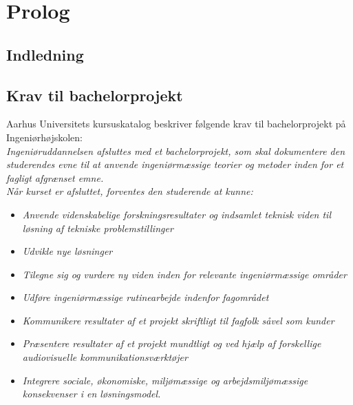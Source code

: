 \documentclass[rapport.tex]{subfiles}
\begin{document}
\section{Prolog}
	\subsection{Indledning}
	\subsection{Krav til bachelorprojekt}
	Aarhus Universitets kursuskatalog beskriver følgende krav til bachelorprojekt på Ingeniørhøjskolen:\\
	
	
\textit{	Ingeniøruddannelsen afsluttes med et bachelorprojekt, som skal dokumentere den studerendes evne til at anvende ingeniørmæssige teorier og metoder inden for et fagligt afgrænset emne. }\\

	
\textit{	Når kurset er afsluttet, forventes den studerende at kunne: 
}	
	\begin{itemize}
		\item\textit{ Anvende videnskabelige forskningsresultater og indsamlet teknisk viden til løsning af tekniske problemstillinger}
		\item \textit{Udvikle nye løsninger}
		\item \textit{Tilegne sig og vurdere ny viden inden for relevante ingeniørmæssige områder}
		\item \textit{Udføre ingeniørmæssige rutinearbejde indenfor fagområdet}
		\item \textit{Kommunikere resultater af et projekt skriftligt til fagfolk såvel som kunder}
		\item \textit{Præsentere resultater af et projekt mundtligt og ved hjælp af forskellige audiovisuelle kommunikationsværktøjer}
		\item \textit{Integrere sociale, økonomiske, miljømæssige og arbejdsmiljømæssige konsekvenser i en løsningsmodel.}
	\end{itemize}
	
\end{document}
